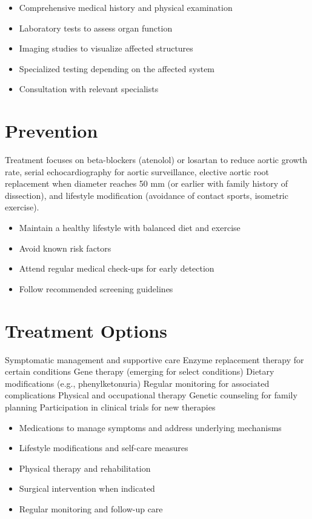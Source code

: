 \begin{itemize}[noitemsep]
  \item Comprehensive medical history and physical examination
  \item Laboratory tests to assess organ function
  \item Imaging studies to visualize affected structures
  \item Specialized testing depending on the affected system
  \item Consultation with relevant specialists
\end{itemize}
\section{Prevention}
Treatment focuses on beta-blockers (atenolol) or losartan to reduce aortic growth rate, serial echocardiography for aortic surveillance, elective aortic root replacement when diameter reaches 50 mm (or earlier with family history of dissection), and lifestyle modification (avoidance of contact sports, isometric exercise).

\begin{itemize}[noitemsep]
  \item Maintain a healthy lifestyle with balanced diet and exercise
  \item Avoid known risk factors
  \item Attend regular medical check-ups for early detection
  \item Follow recommended screening guidelines
\end{itemize}
\section{Treatment Options}
Symptomatic management and supportive care Enzyme replacement therapy for certain conditions Gene therapy (emerging for select conditions) Dietary modifications (e.g., phenylketonuria) Regular monitoring for associated complications Physical and occupational therapy Genetic counseling for family planning Participation in clinical trials for new therapies

\begin{itemize}[noitemsep]
  \item Medications to manage symptoms and address underlying mechanisms
  \item Lifestyle modifications and self-care measures
  \item Physical therapy and rehabilitation
  \item Surgical intervention when indicated
  \item Regular monitoring and follow-up care
\end{itemize}

